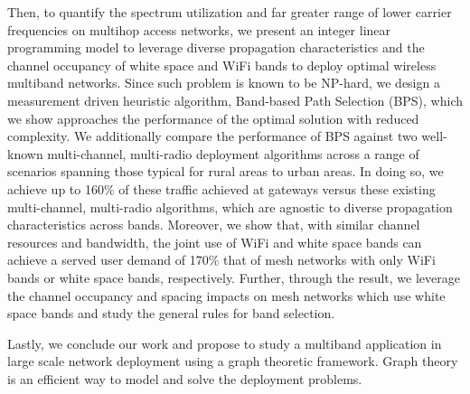 Then, to quantify the spectrum utilization and far greater range of lower carrier 
frequencies on multihop access networks, 
we present an integer 
linear programming model to leverage diverse propagation characteristics and 
the  channel occupancy of white space and WiFi bands to deploy optimal wireless multiband 
networks. Since such problem is known to be NP-hard, we design a measurement driven 
heuristic algorithm, Band-based Path Selection (BPS), which we show approaches 
the performance of the optimal solution with reduced complexity.  We additionally 
compare the performance of BPS against two well-known multi-channel, multi-radio 
deployment algorithms across a range of scenarios spanning those typical for 
rural areas to urban areas. In doing so, we achieve up to 160\% of these traffic achieved 
at gateways versus these existing multi-channel, multi-radio algorithms, which are 
agnostic to diverse propagation characteristics across bands.  Moreover, we show 
that, with similar channel resources and bandwidth, the joint use of WiFi and 
white space bands can achieve a served user demand of 170\% that of mesh networks 
with only WiFi bands or white space bands, respectively. Further, through the 
result, we leverage the channel occupancy and spacing impacts on mesh
networks which use white space bands and study the general rules for band selection.

Lastly, we conclude our work and 
propose to study a multiband application in large 
scale network deployment using a graph theoretic framework.
Graph theory is an efficient way to model and solve 
the deployment problems. 

